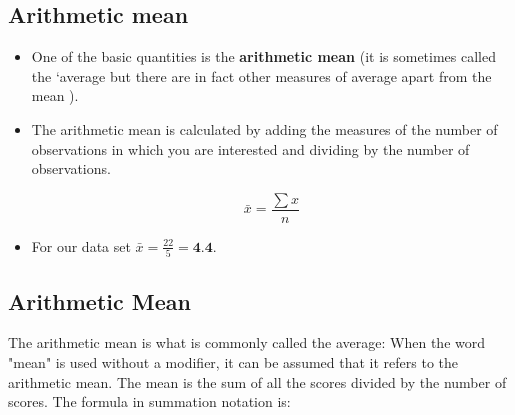\documentclass[]{report}
\begin{document}
%
%




%
%








\subsection{Arithmetic mean} 
\begin{itemize}
\item One of the basic quantities is the \textbf{arithmetic mean} (it is sometimes
called the `average but there are in fact other measures of average apart from the
mean ). 
\item The arithmetic mean is calculated by
adding the measures of the number of observations in which you are interested and
dividing by the number of observations.

\[ \bar{x} =  \frac{\sum x}{n}  \]

\item For our data set $\bar{x} = \frac{22}{5}  = \textbf{4.4}$.
\end{itemize}

\subsection{Arithmetic Mean}
The arithmetic mean is what is commonly called the average: When the word "mean" is used without a modifier, it can be assumed that it refers to the arithmetic mean. The mean is the sum of all the scores divided by the number of scores. The formula in summation notation is:
\end{document}
